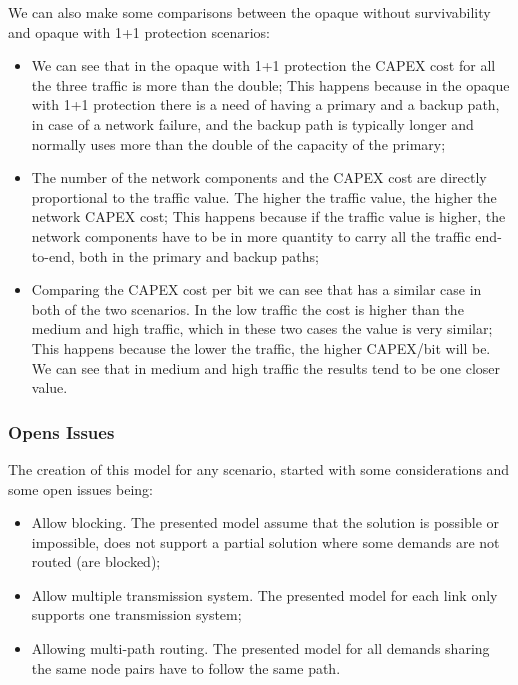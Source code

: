 We can also make some comparisons between the opaque without survivability and opaque with 1+1 protection scenarios:

\begin{itemize}
  \item We can see that in the opaque with 1+1 protection the CAPEX cost for all the three traffic is more than the double;
    \subitem This happens because in the opaque with 1+1 protection there is a need of having a primary and a backup path, in case of a network failure, and the backup path is typically longer and normally uses more than the double of the capacity of the primary;
  \item The number of the network components and the CAPEX cost are directly proportional to the traffic value. The higher the traffic value, the higher the network CAPEX cost;
  \subitem This happens because if the traffic value is higher, the network components have to be in more quantity to carry all the traffic end-to-end, both in the primary and backup paths;
  \item Comparing the CAPEX cost per bit we can see that has a similar case in both of the two scenarios. In the low traffic the cost is higher than the medium and high traffic, which in these two cases the value is very similar;
  \subitem This happens because the lower the traffic, the higher CAPEX/bit will be. We can see that in medium and high traffic the results tend to be one closer value.
\end{itemize}

\vspace{13pt}

\subsubsection{Opens Issues}

The creation of this model for any scenario, started with some considerations and some open issues being:

\begin{itemize}
  \item Allow blocking.
  \subitem The presented model assume that the solution is possible or impossible, does not support a partial solution where some demands are not routed (are blocked);
  \item Allow multiple transmission system.
  \subitem The presented model for each link only supports one transmission system;
  \item Allowing multi-path routing.
  \subitem The presented model for all demands sharing the same node pairs have to follow the same path.
\end{itemize} 